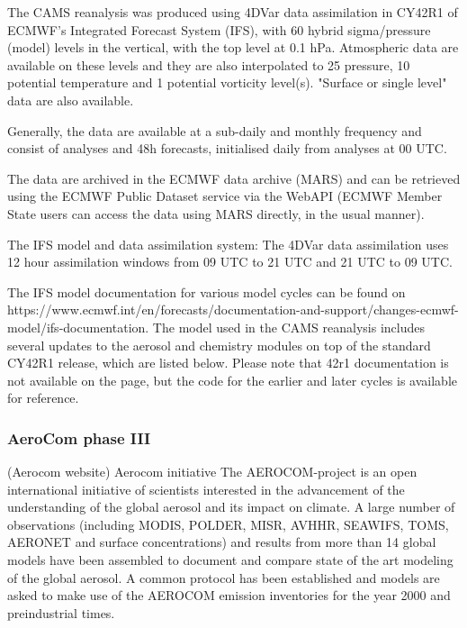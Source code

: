 \documentclass[journal abbreviation, manuscript]{copernicus}
\begin{document}
The CAMS reanalysis was produced using 4DVar data assimilation in CY42R1 of ECMWF’s Integrated Forecast System (IFS), with 60 hybrid sigma/pressure (model) levels in the vertical, with the top level at 0.1 hPa. Atmospheric data are available on these levels and they are also interpolated to 25 pressure, 10 potential temperature and 1 potential vorticity level(s). "Surface or single level" data are also available.

Generally, the data are available at a sub-daily and monthly frequency and consist of analyses and 48h forecasts, initialised daily from analyses at 00 UTC.

The data are archived in the ECMWF data archive (MARS) and can be retrieved using the ECMWF Public Dataset service via the WebAPI (ECMWF Member State users can access the data using MARS directly, in the usual manner).

The IFS model and data assimilation system:
The 4DVar data assimilation uses 12 hour assimilation windows from 09 UTC to 21 UTC and 21 UTC to 09 UTC.

The IFS model documentation for various model cycles can be found on https://www.ecmwf.int/en/forecasts/documentation-and-support/changes-ecmwf-model/ifs-documentation. The model used in the CAMS reanalysis includes several updates to the aerosol and chemistry modules on top of the standard CY42R1 release, which are listed below. Please note that 42r1 documentation is not available on the page, but the code for the earlier and later cycles is available for reference.

\subsubsection{AeroCom phase III}
(Aerocom website) Aerocom initiative The AEROCOM-project is an open international initiative of scientists interested in the advancement of the understanding of the global aerosol and its impact on climate. A large number of observations (including MODIS, POLDER, MISR, AVHHR, SEAWIFS, TOMS, AERONET and surface concentrations) and results from more than 14 global models have been assembled to document and compare state of the art modeling of the global aerosol. A common protocol has been established and models are asked to make use of the AEROCOM emission inventories for the year 2000 and preindustrial times.
\end{document}

